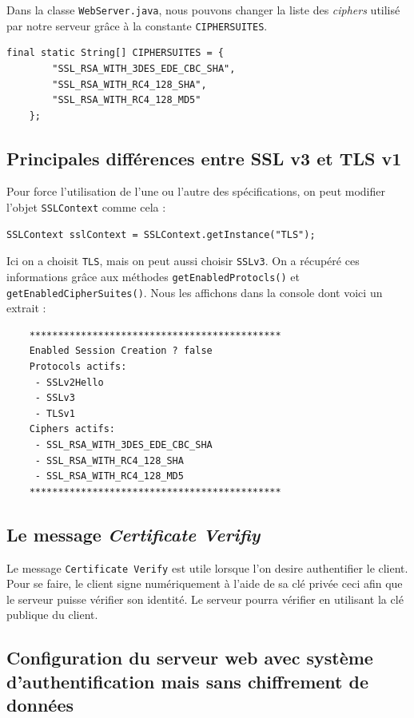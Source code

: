 \documentclass[10pt,a4paper,titlepage]{article}
\begin{document}
Dans la classe \texttt{WebServer.java}, nous pouvons changer la liste des \emph{ciphers} utilisé par notre serveur grâce à la constante \texttt{CIPHERSUITES}.

\begin{lstlisting}[frame=trBL]
	final static String[] CIPHERSUITES = {
		"SSL_RSA_WITH_3DES_EDE_CBC_SHA",  
		"SSL_RSA_WITH_RC4_128_SHA",
		"SSL_RSA_WITH_RC4_128_MD5"
	};
\end{lstlisting}

\subsection{Principales différences entre SSL v3 et TLS v1}

Pour force l'utilisation de l'une ou l'autre des spécifications, on peut modifier l'objet \texttt{SSLContext} comme cela :

\begin{lstlisting}[frame=trBL]
SSLContext sslContext = SSLContext.getInstance("TLS");
\end{lstlisting}

Ici on a choisit \texttt{TLS}, mais on peut aussi choisir \texttt{SSLv3}. On a récupéré ces informations grâce aux méthodes \texttt{getEnabledProtocls()} et \texttt{getEnabledCipherSuites()}. Nous les affichons dans la console dont voici un extrait : 

\begin{verbatim}
	********************************************
	Enabled Session Creation ? false
	Protocols actifs:
	 - SSLv2Hello
	 - SSLv3
	 - TLSv1
	Ciphers actifs:
	 - SSL_RSA_WITH_3DES_EDE_CBC_SHA
	 - SSL_RSA_WITH_RC4_128_SHA
	 - SSL_RSA_WITH_RC4_128_MD5
	********************************************
\end{verbatim}

\subsection{Le message \emph{Certificate Verifiy}}

Le message \texttt{Certificate Verify} est utile lorsque l'on desire authentifier le client. Pour se faire, le client signe numériquement à l'aide de sa clé privée ceci afin que le serveur puisse vérifier son identité. Le serveur pourra vérifier en utilisant la clé publique du client.

\subsection{Configuration du serveur web avec système d'authentification mais sans chiffrement de données}
\end{document}
